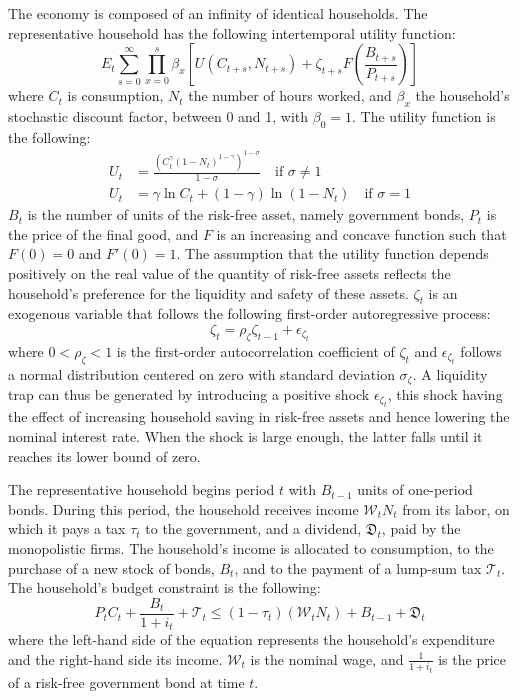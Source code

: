 \documentclass[12pt,letterpaper]{article}
\newcommand{\Et}{E_t}
\newcommand{\WW}{\mathcal{W}}
\newcommand{\TT}{\mathcal{T}}
\newcommand{\DD}{\mathfrak{D}}
\begin{document}
The economy is composed of an infinity of identical households. The representative household has the following intertemporal utility function:
\begin{equation}
\Et \sum_{s=0}^{\infty} \prod_{x=0}^{s} \beta_x \left[ U(C_{t+s}, N_{t+s}) + \zeta_{t+s} F\!\left(\frac{B_{t+s}}{P_{t+s}}\right) \right] \tag{1}
\end{equation}
where $C_t$ is consumption, $N_t$ the number of hours worked, and $\beta_x$ the household's stochastic discount factor, between 0 and 1, with $\beta_0 = 1$. The utility function is the following:
\begin{align}
U_t &= \frac{\left(C_t^{\gamma}(1-N_t)^{1-\gamma}\right)^{1-\sigma}}{1-\sigma} \quad \text{if } \sigma \neq 1 \tag{2}\\
U_t &= \gamma \ln C_t + (1-\gamma)\ln(1-N_t) \quad \text{if } \sigma = 1 \tag{3}
\end{align}
$B_t$ is the number of units of the risk-free asset, namely government bonds, $P_t$ is the price of the final good, and $F$ is an increasing and concave function such that $F(0)=0$ and $F'(0)=1$. The assumption that the utility function depends positively on the real value of the quantity of risk-free assets reflects the household's preference for the liquidity and safety of these assets. $\zeta_t$ is an exogenous variable that follows the following first-order autoregressive process:
\begin{equation}
\zeta_t = \rho_\zeta \zeta_{t-1} + \epsilon_{\zeta_t} \tag{4}
\end{equation}
where $0 < \rho_\zeta < 1$ is the first-order autocorrelation coefficient of $\zeta_t$ and $\epsilon_{\zeta_t}$ follows a normal distribution centered on zero with standard deviation $\sigma_\zeta$. A liquidity trap can thus be generated by introducing a positive shock $\epsilon_{\zeta_t}$, this shock having the effect of increasing household saving in risk-free assets and hence lowering the nominal interest rate. When the shock is large enough, the latter falls until it reaches its lower bound of zero.

The representative household begins period $t$ with $B_{t-1}$ units of one-period bonds. During this period, the household receives income $\WW_t N_t$ from its labor, on which it pays a tax $\tau_t$ to the government, and a dividend, $\DD_t$, paid by the monopolistic firms. The household's income is allocated to consumption, to the purchase of a new stock of bonds, $B_t$, and to the payment of a lump-sum tax $\TT_t$. The household's budget constraint is the following:
\begin{equation}
P_t C_t + \frac{B_t}{1+i_t} + \TT_t \leq (1-\tau_t)(\WW_t N_t) + B_{t-1} + \DD_t \tag{5}
\end{equation}
where the left-hand side of the equation represents the household's expenditure and the right-hand side its income. $\WW_t$ is the nominal wage, and $\frac{1}{1+i_t}$ is the price of a risk-free government bond at time $t$.
\end{document}
